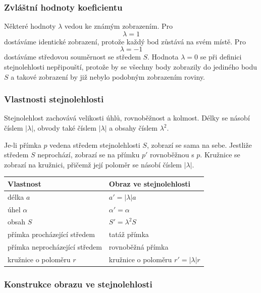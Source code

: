 \documentclass[12pt,a4paper]{article}
\begin{document}
\subsubsection*{Zvláštní hodnoty koeficientu}

Některé hodnoty $\lambda$ vedou ke známým zobrazením. Pro
\[
    \lambda=1
\]
dostáváme identické zobrazení, protože každý bod zůstává na svém místě. Pro
\[
    \lambda=-1
\]
dostáváme středovou souměrnost se středem $S$. Hodnota $\lambda=0$ se při definici stejnolehlosti nepřipouští, protože by se všechny body zobrazily do jediného bodu $S$ a takové zobrazení by již nebylo podobným zobrazením roviny.

\subsubsection*{Vlastnosti stejnolehlosti}

Stejnolehlost zachovává velikosti úhlů, rovnoběžnost a kolmost. Délky se násobí číslem $|\lambda|$, obvody také číslem $|\lambda|$ a obsahy číslem $\lambda^2$.

Je-li přímka $p$ vedena středem stejnolehlosti $S$, zobrazí se sama na sebe. Jestliže středem $S$ neprochází, zobrazí se na přímku $p'$ rovnoběžnou s $p$. Kružnice se zobrazí na kružnici, přičemž její poloměr se násobí číslem $|\lambda|$.

\begin{center}
\begin{tabular}{|C{5.2cm}|C{8.2cm}|}
    \hline
    \textbf{Vlastnost} & \textbf{Obraz ve stejnolehlosti} \\
    \hline
    délka $a$ & $a'=|\lambda|a$ \\
    \hline
    úhel $\alpha$ & $\alpha'=\alpha$ \\
    \hline
    obsah $S$ & $S'=\lambda^2S$ \\
    \hline
    přímka procházející středem & tatáž přímka \\
    \hline
    přímka neprocházející středem & rovnoběžná přímka \\
    \hline
    kružnice o poloměru $r$ & kružnice o poloměru $r'=|\lambda|r$ \\
    \hline
\end{tabular}
\end{center}

\subsubsection*{Konstrukce obrazu ve stejnolehlosti}
\end{document}
